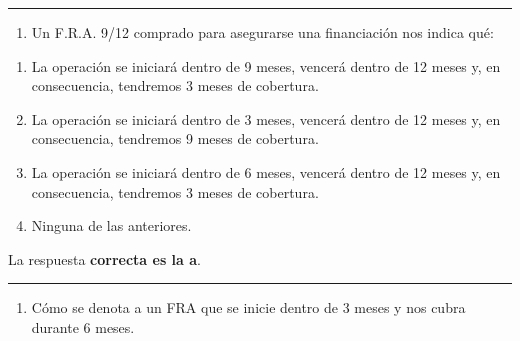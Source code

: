 \documentclass[
  letterpaper,
  DIV=11,
  numbers=noendperiod]{scrreprt}
\providecommand{\tightlist}{%
  \setlength{\itemsep}{0pt}\setlength{\parskip}{0pt}}\usepackage{longtable,booktabs,array}
\begin{document}
\begin{center}\rule{0.5\linewidth}{0.5pt}\end{center}

\begin{enumerate}
\def\labelenumi{\arabic{enumi}.}
\setcounter{enumi}{48}
\tightlist
\item
  Un F.R.A. 9/12 comprado para asegurarse una financiación nos indica
  qué:
\end{enumerate}

\begin{enumerate}
\def\labelenumi{\alph{enumi}.}
\item
  La operación se iniciará dentro de 9 meses, vencerá dentro de 12 meses
  y, en consecuencia, tendremos 3 meses de cobertura.
\item
  La operación se iniciará dentro de 3 meses, vencerá dentro de 12 meses
  y, en consecuencia, tendremos 9 meses de cobertura.
\item
  La operación se iniciará dentro de 6 meses, vencerá dentro de 12 meses
  y, en consecuencia, tendremos 3 meses de cobertura.
\item
  Ninguna de las anteriores.
\end{enumerate}

\begin{tcolorbox}[enhanced jigsaw, left=2mm, opacityback=0, colback=white, breakable, arc=.35mm, bottomrule=.15mm, rightrule=.15mm, toprule=.15mm, leftrule=.75mm, colframe=quarto-callout-tip-color-frame]
\begin{minipage}[t]{5.5mm}
\textcolor{quarto-callout-tip-color}{\faLightbulb}
\end{minipage}%
\begin{minipage}[t]{\textwidth - 5.5mm}

La respuesta \textbf{correcta es la a}.

\end{minipage}%
\end{tcolorbox}

\begin{center}\rule{0.5\linewidth}{0.5pt}\end{center}

\begin{enumerate}
\def\labelenumi{\arabic{enumi}.}
\setcounter{enumi}{49}
\tightlist
\item
  Cómo se denota a un FRA que se inicie dentro de 3 meses y nos cubra
  durante 6 meses.
\end{enumerate}
\end{document}
